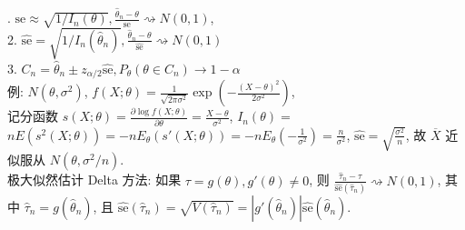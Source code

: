 \documentclass[a4paper, landscape,10pt]{article}
\begin{document}
\begin{multicols}{4}
. $\mathrm{se} \approx \sqrt{1 / I_n(\theta)}, \frac{\hat \theta_n - \theta}{\mathrm{se}} \rightsquigarrow N(0, 1)$, \\
2. $\hat {\mathrm{se}} = \sqrt{1 / I_n(\hat \theta_n)}, \frac{\hat \theta_n - \theta}{\hat {\mathrm{se}}} \rightsquigarrow N(0, 1)$\\
3. $C_n = \hat \theta_n \pm z_{\alpha/2} \hat {\mathrm{se}}, P_\theta(\theta \in C_n) \rightarrow 1 - \alpha$\\
例: $N(\theta, \sigma ^ 2)$,
$f(X; \theta) = \frac{1}{\sqrt{2\pi\sigma^2}} \exp \left( - \frac{(X - \theta)^2}{2\sigma^2} \right)$,\\
记分函数 $s(X; \theta) = \frac{\partial \log f(X; \theta)}{\partial \theta} = \frac{X - \theta}{\sigma^2}$,
$I_n(\theta) = $ $n E(s^2(X; \theta)) = -n E_\theta(s'(X; \theta)) = -n E_\theta(-\frac 1 {\sigma^2}) = \frac {n} {\sigma^2}$,
$\hat {\mathrm{se}} = \sqrt{\frac{\sigma^2}{n}}$, 故 $\overline X$ 近似服从 $N(\theta, \sigma^2 / n)$. \\
极大似然估计 Delta 方法: 如果 $\tau = g(\theta), g'(\theta) \neq 0$, 则 $\frac {\hat \tau_n - \tau} {\hat {\mathrm{se}}(\hat \tau_n)} \rightsquigarrow N(0, 1)$,
其中 $\hat \tau_n = g(\hat \theta_n)$, 且 $\hat {\mathrm{se}}(\hat \tau_n) = \sqrt{V(\hat \tau_n)} = |g'(\hat \theta_n)| \hat {\mathrm{se}}(\hat \theta_n)$. \\


\end{multicols}
\end{document}
